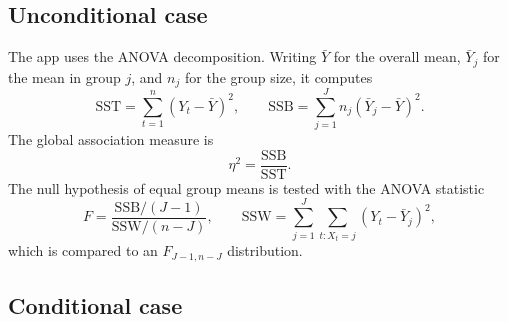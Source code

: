 \documentclass[11pt]{article}
\begin{document}
\begin{appendix}
\subsection{Unconditional case}

The app uses the ANOVA decomposition. Writing $\bar{Y}$ for the overall mean,
$\bar{Y}_j$ for the mean in group $j$, and $n_j$ for the group size, it
computes
\begin{equation}
\mathrm{SST} = \sum_{t=1}^{n}(Y_t - \bar{Y})^2,
\qquad
\mathrm{SSB} = \sum_{j=1}^{J} n_j (\bar{Y}_j - \bar{Y})^2.
\label{eq:app-sst-ssb}
\end{equation}
The global association measure is
\begin{equation}
\eta^2 = \frac{\mathrm{SSB}}{\mathrm{SST}}.
\label{eq:app-eta2}
\end{equation}
The null hypothesis of equal group means is tested with the ANOVA statistic
\begin{equation}
F
=
\frac{\mathrm{SSB}/(J-1)}{\mathrm{SSW}/(n-J)},
\qquad
\mathrm{SSW} = \sum_{j=1}^{J}\sum_{t:X_t=j}(Y_t - \bar{Y}_j)^2,
\label{eq:app-anova-f}
\end{equation}
which is compared to an $F_{J-1,n-J}$ distribution.

\subsection{Conditional case}


\end{appendix}
\end{document}
